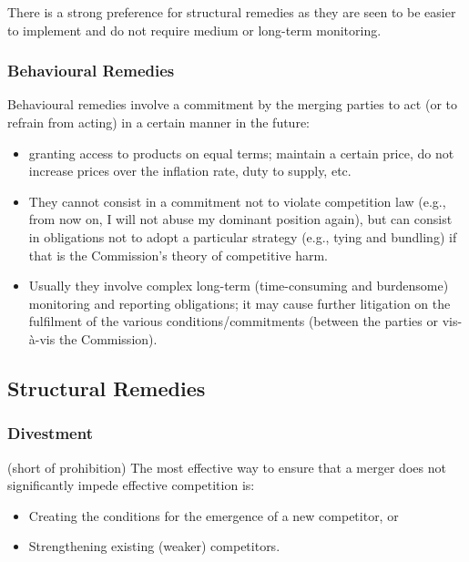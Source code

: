     There is a strong preference for structural remedies as they are seen to be easier to implement and do not require medium or long-term monitoring.

    \subsubsection{Behavioural Remedies}
    
    Behavioural remedies involve a commitment by the merging parties to act (or to refrain from acting) in a certain manner in the future:
    \begin{itemize}
        \item granting access to products on equal terms; maintain a certain price, do not increase prices over the inflation rate, duty to supply, etc.
        \item They cannot consist in a commitment not to violate competition law (e.g., from now on, I will not abuse my dominant position again), but can consist in obligations not to adopt a particular strategy (e.g., tying and bundling) if that is the Commission’s theory of competitive harm.
        \item Usually they involve complex long-term (time-consuming and burdensome) monitoring and reporting obligations; it may cause further litigation on the fulfilment of the various conditions/commitments (between the parties or vis-à-vis the Commission).
    \end{itemize}
    

    \subsection{Structural Remedies}

        \subsubsection{Divestment}

            (short of prohibition) The most effective way to ensure that a merger does not significantly impede effective competition is:
            \begin{itemize}
                \item Creating the conditions for the emergence of a new competitor, or
            
                \item Strengthening existing (weaker) competitors.
            \end{itemize}

